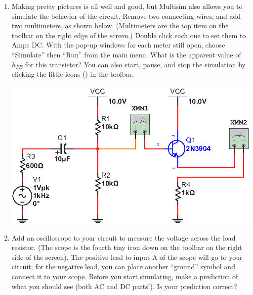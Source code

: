 \begin{enumerate}[wide]
\item Making pretty pictures is all well and good, but Multisim also allows you to simulate the behavior of the circuit.  Remove two connecting wires, and add two multimeters, as shown below.  (Multimeters are the top item on the toolbar on the right edge of the screen.)  Double click each one to set them to Amps DC.  With the pop-up windows for each meter still open, choose ``Simulate'' then ``Run'' from the main menu.  What is the apparent value of $h_{FE}$ for this transistor?  You can also start, pause, and stop the simulation by clicking the little icons ()  in the toolbar.
\begin{center}
\includegraphics{multisim/multimeters.eps}
\end{center}

\item Add an oscilloscope to your circuit to measure the voltage across the load resistor. (The scope is the fourth tiny icon down on the toolbar on the right side of the screen).  The positive lead to input A of the scope will go to your circuit; for the negative lead, you can place another ``ground'' symbol and connect it to your scope.  Before you start simulating, make a prediction of what you should see (both AC and DC parts!).  Is your prediction correct?


\end{enumerate}
